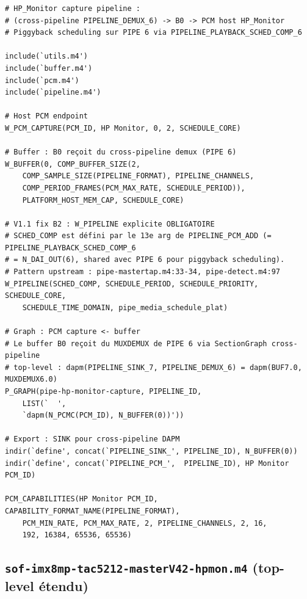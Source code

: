 \documentclass[11pt,a4paper]{article}
\begin{document}
\begin{lstlisting}[language={}, basicstyle=\ttfamily\scriptsize]
# HP_Monitor capture pipeline :
# (cross-pipeline PIPELINE_DEMUX_6) -> B0 -> PCM host HP_Monitor
# Piggyback scheduling sur PIPE 6 via PIPELINE_PLAYBACK_SCHED_COMP_6

include(`utils.m4')
include(`buffer.m4')
include(`pcm.m4')
include(`pipeline.m4')

# Host PCM endpoint
W_PCM_CAPTURE(PCM_ID, HP Monitor, 0, 2, SCHEDULE_CORE)

# Buffer : B0 reçoit du cross-pipeline demux (PIPE 6)
W_BUFFER(0, COMP_BUFFER_SIZE(2,
	COMP_SAMPLE_SIZE(PIPELINE_FORMAT), PIPELINE_CHANNELS,
	COMP_PERIOD_FRAMES(PCM_MAX_RATE, SCHEDULE_PERIOD)),
	PLATFORM_HOST_MEM_CAP, SCHEDULE_CORE)

# V1.1 fix B2 : W_PIPELINE explicite OBLIGATOIRE
# SCHED_COMP est défini par le 13e arg de PIPELINE_PCM_ADD (= PIPELINE_PLAYBACK_SCHED_COMP_6
# = N_DAI_OUT(6), shared avec PIPE 6 pour piggyback scheduling).
# Pattern upstream : pipe-mastertap.m4:33-34, pipe-detect.m4:97
W_PIPELINE(SCHED_COMP, SCHEDULE_PERIOD, SCHEDULE_PRIORITY, SCHEDULE_CORE,
	SCHEDULE_TIME_DOMAIN, pipe_media_schedule_plat)

# Graph : PCM capture <- buffer
# Le buffer B0 reçoit du MUXDEMUX de PIPE 6 via SectionGraph cross-pipeline
# top-level : dapm(PIPELINE_SINK_7, PIPELINE_DEMUX_6) = dapm(BUF7.0, MUXDEMUX6.0)
P_GRAPH(pipe-hp-monitor-capture, PIPELINE_ID,
	LIST(`	',
	`dapm(N_PCMC(PCM_ID), N_BUFFER(0))'))

# Export : SINK pour cross-pipeline DAPM
indir(`define', concat(`PIPELINE_SINK_', PIPELINE_ID), N_BUFFER(0))
indir(`define', concat(`PIPELINE_PCM_',  PIPELINE_ID), HP Monitor PCM_ID)

PCM_CAPABILITIES(HP Monitor PCM_ID, CAPABILITY_FORMAT_NAME(PIPELINE_FORMAT),
	PCM_MIN_RATE, PCM_MAX_RATE, 2, PIPELINE_CHANNELS, 2, 16,
	192, 16384, 65536, 65536)
\end{lstlisting}

\subsection{\texttt{sof-imx8mp-tac5212-masterV42-hpmon.m4} (top-level étendu)}
\end{document}
